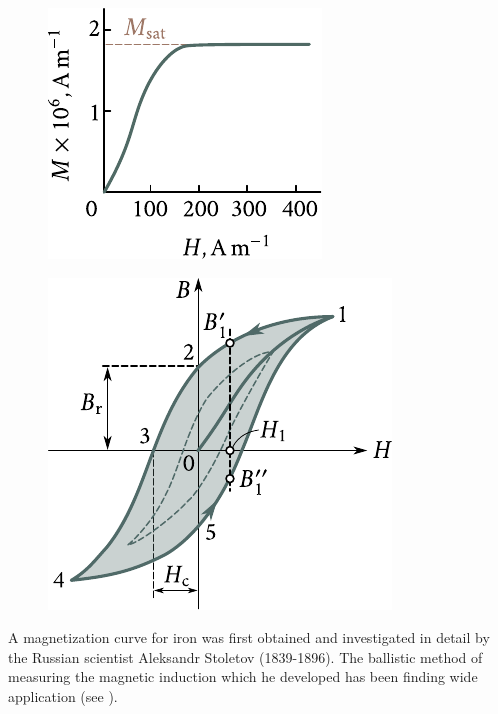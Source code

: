 \begin{figure}[t]
	\begin{minipage}[t]{0.48\linewidth}
		\begin{center}
			\includegraphics[scale=1]{figures/ch_07/fig_7_17.pdf}
			\caption[]{}
			\label{fig:7_17}
		\end{center}
	\end{minipage}
	\hfill{ }%
	\begin{minipage}[t]{0.48\linewidth}
		\begin{center}
			\includegraphics[scale=1]{figures/ch_07/fig_7_18.pdf}
			\caption[]{}
			\label{fig:7_18}
		\end{center}
	\end{minipage}
\vspace{-0.4cm}
\end{figure}

A magnetization curve for iron was first obtained and investigated in detail by the Russian scientist Aleksandr Stoletov (1839-1896).
The ballistic method of measuring the magnetic induction which he developed has been finding wide application (see ).

